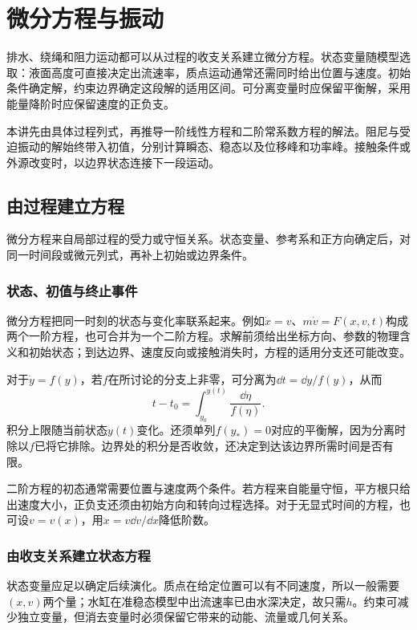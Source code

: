 \chapter{微分方程与振动}\label{ch:c2}

排水、绕绳和阻力运动都可以从过程的收支关系建立微分方程。状态变量随模型选取：液面高度可直接决定出流速率，质点运动通常还需同时给出位置与速度。初始条件确定解，约束边界确定这段解的适用区间。可分离变量时应保留平衡解，采用能量降阶时应保留速度的正负支。

本讲先由具体过程列式，再推导一阶线性方程和二阶常系数方程的解法。阻尼与受迫振动的解始终带入初值，分别计算瞬态、稳态以及位移峰和功率峰。接触条件或外源改变时，以边界状态连接下一段运动。


\section{由过程建立方程}\label{sec:c2-model}
微分方程来自局部过程的受力或守恒关系。状态变量、参考系和正方向确定后，对同一时间段或微元列式，再补上初始或边界条件。

\subsection{状态、初值与终止事件}
微分方程把同一时刻的状态与变化率联系起来。例如$\dot x=v$、$m\dot v=F(x,v,t)$构成两个一阶方程，也可合并为一个二阶方程。求解前须给出坐标方向、参数的物理含义和初始状态；到达边界、速度反向或接触消失时，方程的适用分支还可能改变。

对于$\dot y=f(y)$，若$f$在所讨论的分支上非零，可分离为$\dd t=\dd y/f(y)$，从而
\begin{equation}t-t_0=\int_{y_0}^{y(t)}\frac{\dd\eta}{f(\eta)}.
\end{equation}
积分上限随当前状态$y(t)$变化。还须单列$f(y_*)=0$对应的平衡解，因为分离时除以$f$已将它排除。边界处的积分是否收敛，还决定到达该边界所需时间是否有限。

二阶方程的初态通常需要位置与速度两个条件。若方程来自能量守恒，平方根只给出速度大小，正负支还须由初始方向和转向过程选择。对于无显式时间的方程，也可设$v=v(x)$，用$\ddot x=v\dd v/\dd x$降低阶数。

\subsection{由收支关系建立状态方程}
状态变量应足以确定后续演化。质点在给定位置可以有不同速度，所以一般需要$(x,v)$两个量；水缸在准稳态模型中出流速率已由水深决定，故只需$h$。约束可减少独立变量，但消去变量时必须保留它带来的动能、流量或几何关系。

